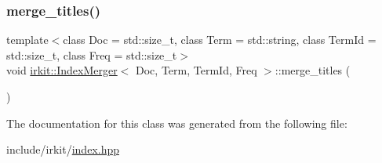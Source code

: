 \mbox{\label{classirkit_1_1IndexMerger_a7c510436b6dbc5999404e2f8dd1818b7}} 
\subsubsection{\texorpdfstring{merge\+\_\+titles()}{merge\_titles()}}
{\footnotesize\ttfamily template$<$class Doc  = std\+::size\+\_\+t, class Term  = std\+::string, class Term\+Id  = std\+::size\+\_\+t, class Freq  = std\+::size\+\_\+t$>$ \\
void \mbox{\hyperlink{classirkit_1_1IndexMerger}{irkit\+::\+Index\+Merger}}$<$ Doc, Term, Term\+Id, Freq $>$\+::merge\+\_\+titles (\begin{DoxyParamCaption}{ }\end{DoxyParamCaption})\hspace{0.3cm}{\ttfamily [inline]}}



The documentation for this class was generated from the following file\+:\begin{DoxyCompactItemize}
\item 
include/irkit/\mbox{\hyperlink{irkit_2index_8hpp}{index.\+hpp}}\end{DoxyCompactItemize}
